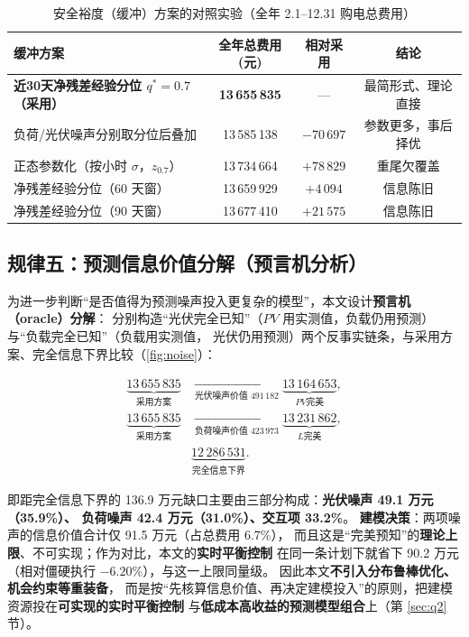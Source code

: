 \begin{table}[htbp]
\centering
\caption{安全裕度（缓冲\nobreak）方案的对照实验（全年 2.1--12.31 购电总费用\nobreak）}
\label{tab:buffer}
\begin{tabular}{@{}lccc@{}}
\toprule
缓冲方案 & 全年总费用(元) & 相对采用 & 结论 \\
\midrule
\textbf{近30天净残差经验分位 $q^*=0.7$（采用\nobreak）} & \textbf{13\,655\,835} & --- & 最简形式\nobreak、理论直接 \\
负荷/光伏噪声分别取分位后叠加 & 13\,585\,138 & $-70\,697$ & 参数更多\nobreak，事后择优 \\
正态参数化（按小时 $\sigma$\nobreak，$z_{0.7}$\nobreak） & 13\,734\,664 & $+78\,829$ & 重尾欠覆盖 \\
净残差经验分位（60 天窗\nobreak） & 13\,659\,929 & $+4\,094$ & 信息陈旧 \\
净残差经验分位（90 天窗\nobreak） & 13\,677\,410 & $+21\,575$ & 信息陈旧 \\
\bottomrule
\end{tabular}
\end{table}

\subsection{规律五\nobreak：预测信息价值分解（预言机分析\nobreak）}

为进一步判断“是否值得为预测噪声投入更复杂的模型\nobreak”\nobreak，本文设计\textbf{预言机（oracle\nobreak）分解}\nobreak：
分别构造“光伏完全已知\nobreak”（$PV$ 用实测值\nobreak，负载仍用预测\nobreak）与“负载完全已知\nobreak”（负载用实测值\nobreak，
光伏仍用预测\nobreak）两个反事实链条\nobreak，与采用方案\nobreak、完全信息下界比较（\cref{fig:noise}\nobreak）\nobreak：

\begin{equation}
\begin{aligned}
\underbrace{13\,655\,835}_{\text{采用方案}}
&\xrightarrow[\text{光伏噪声价值 }491\,182]{}
\underbrace{13\,164\,653}_{PV\text{完美}},\\
\underbrace{13\,655\,835}_{\text{采用方案}}
&\xrightarrow[\text{负荷噪声价值 }423\,973]{}
\underbrace{13\,231\,862}_{L\text{完美}},\\
&\underbrace{12\,286\,531}_{\text{完全信息下界}} .
\end{aligned}
\end{equation}

即距完全信息下界的 136.9 万元缺口主要由三部分构成\nobreak：\textbf{光伏噪声 49.1 万元（35.9\%\nobreak）\nobreak、
负荷噪声 42.4 万元（31.0\%\nobreak）\nobreak、交互项 33.2\%}\nobreak。
\textbf{建模决策}\nobreak：两项噪声的信息价值合计仅 91.5 万元（占总费用 6.7\%\nobreak）\nobreak，
而且这是“完美预知\nobreak”的\textbf{理论上限}\nobreak、不可实现\nobreak；作为对比\nobreak，本文的\textbf{实时平衡控制}
在同一条计划下就省下 90.2 万元（相对僵硬执行 $-6.20\text{\%}$\nobreak）\nobreak，与这一上限同量级\nobreak。
因此本文\textbf{不引入分布鲁棒优化\nobreak、机会约束等重装备}\nobreak，
而是按“先核算信息价值\nobreak、再决定建模投入\nobreak”的原则\nobreak，把建模资源投在\textbf{可实现的实时平衡控制}
与\textbf{低成本高收益的预测模型组合}上（第 \ref{sec:q2} 节\nobreak）\nobreak。

